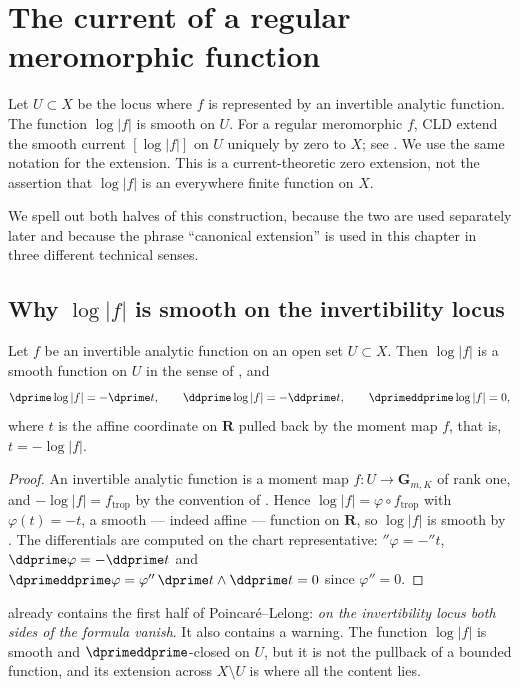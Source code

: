 \section{The current of a regular meromorphic function}
\label{sec:ch15-current-log}

Let $U\subset X$ be the locus where $f$ is represented by an invertible
analytic function.  The function $\log|f|$ is smooth on $U$.  For a regular
meromorphic $f$, CLD extend the smooth current $[\log|f|]$ on $U$ uniquely
by zero to $X$; see \cite[\S16.7.2 and Lemma~7.1.13]{CLD25}.  We use the
same notation for the extension.  This is a current-theoretic zero extension,
not the assertion that $\log|f|$ is an everywhere finite function on $X$.

We spell out both halves of this construction, because the two are used
separately later and because the phrase ``canonical extension'' is used in
this chapter in three different technical senses.

\subsection{Why \texorpdfstring{$\log|f|$}{log|f|} is smooth on the
invertibility locus}

\begin{lemma}
\label{lem:ch15-log-smooth}
Let $f$ be an invertible analytic function on an open set $U\subset X$.  Then
$\log|f|$ is a smooth function on $U$ in the sense of
, and
\[
 \dprime\log|f|=-\dprime t,\qquad
 \ddprime\log|f|=-\ddprime t,\qquad
 \dprimeddprime\log|f|=0 ,
\]
where $t$ is the affine coordinate on $\mathbf R$ pulled back by the moment
map $f$, that is, $t=-\log|f|$.
\end{lemma}

\begin{proof}
An invertible analytic function is a moment map $f:U\to\mathbf G_{m,K}$ of
rank one, and $-\log|f|=f_{\mathrm{trop}}$ by the convention of
.  Hence $\log|f|=\varphi\circ f_{\mathrm{trop}}$ with
$\varphi(t)=-t$, a smooth --- indeed affine --- function on $\mathbf R$, so
$\log|f|$ is smooth by .  The differentials
are computed on the chart representative: $\dprime\varphi=-\dprime t$,
$\ddprime\varphi=-\ddprime t$ and $\dprimeddprime\varphi=\varphi''\,\dprime
t\wedge\ddprime t=0$ since $\varphi''=0$.
\end{proof}

 already contains the first half of
Poincar\'e--Lelong: \emph{on the invertibility locus both sides of the formula
vanish}.  It also contains a warning.  The function $\log|f|$ is smooth and
$\dprimeddprime$-closed on $U$, but it is not the pullback of a bounded
function, and its extension across $X\setminus U$ is where all the content
lies.

